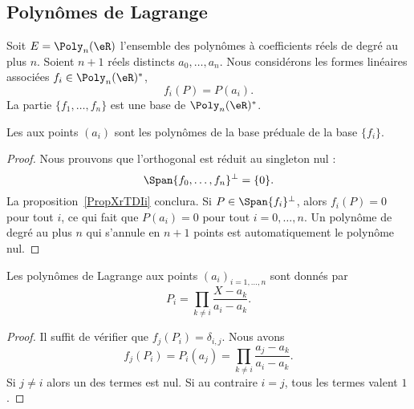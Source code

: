 \subsection{Polynômes de Lagrange}

\begin{lemmaDef}
	Soit \( E=\Poly_n(\eR)\) l'ensemble des polynômes à coefficients réels de degré au plus \( n\). Soient \( n+1\) réels distincts \( a_0,\ldots, a_n\). Nous considérons les formes linéaires associées \( f_i\in \Poly_n(\eR)^*\),
	\begin{equation}
		f_i(P)=P(a_i).
	\end{equation}
	La partie \( \{ f_1,\ldots, f_n \}\) est une base de \( \Poly_n(\eR)^*\).

	Les  aux points \( (a_i)\) sont les polynômes de la base préduale de la base \( \{ f_i \}\).
\end{lemmaDef}

\begin{proof}
	Nous prouvons que l'orthogonal est réduit au singleton nul :
	\begin{equation}
		\Span\{ f_0,\ldots, f_n \}^{\perp}=\{ 0 \}.
	\end{equation}
	La proposition~\ref{PropXrTDIi} conclura. Si \( P\in\Span\{ f_i \}^{\perp}\), alors \( f_i(P)=0\) pour tout \( i\), ce qui fait que \( P(a_i)=0\) pour tout \( i=0,\ldots, n\). Un polynôme de degré au plus \( n\) qui s'annule en \( n+1\) points est automatiquement le polynôme nul.
\end{proof}

\begin{proposition}
	Les polynômes de Lagrange aux points \( (a_i)_{i=1,\ldots, n}\) sont donnés par
	\begin{equation}
		P_i=\prod_{k\neq i}\frac{ X-a_k }{ a_i-a_k }.
	\end{equation}
\end{proposition}

\begin{proof}
	Il suffit de vérifier que \( f_j(P_i)=\delta_{i,j}\). Nous avons
	\begin{equation}
		f_j(P_i)=P_i(a_j)=\prod_{k\neq i}\frac{ a_j-a_k }{ a_i-a_k }.
	\end{equation}
	Si \( j\neq i\) alors un des termes est nul. Si au contraire \( i=j\), tous les termes valent \( 1\).
\end{proof}

